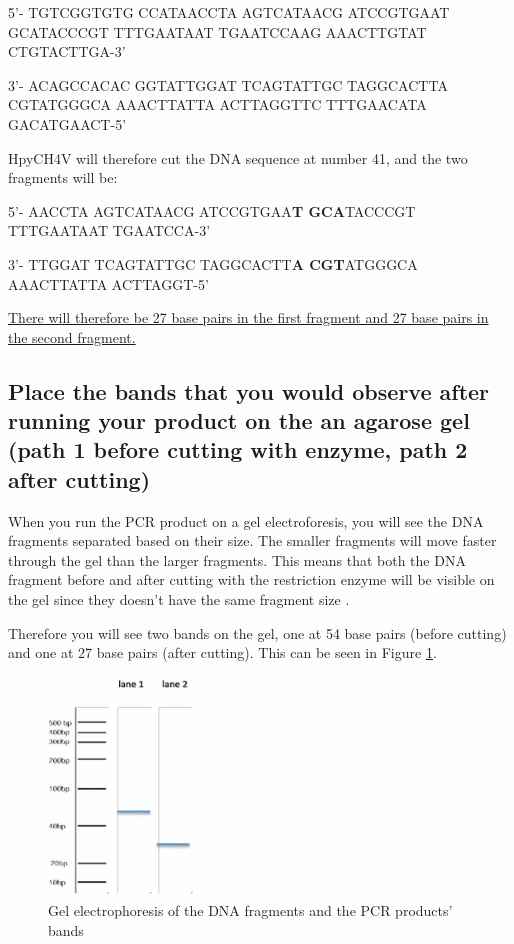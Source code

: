 5'- TGTCGGTGTG CCATAACCTA AGTCATAACG ATCCGTGAAT GCATACCCGT TTTGAATAAT TGAATCCAAG AAACTTGTAT CTGTACTTGA-3'

3'- ACAGCCACAC GGTATTGGAT TCAGTATTGC TAGGCACTTA CGTATGGGCA AAACTTATTA ACTTAGGTTC TTTGAACATA GACATGAACT-5'
\vspace{1em}

HpyCH4V will therefore cut the DNA sequence at number 41, and the two fragments will be:

5'- AACCTA AGTCATAACG ATCCGTGAA\textbf{T GCA}TACCCGT TTTGAATAAT TGAATCCA-3'

3'- TTGGAT TCAGTATTGC TAGGCACTT\textbf{A CGT}ATGGGCA AAACTTATTA ACTTAGGT-5'

\vspace{1em}   
\underline{There will therefore be 27 base pairs in the first fragment and 27 base pairs in the second fragment.}

\subsection{Place the bands that you would observe after running your product on the an agarose gel (path 1 before cutting with enzyme, path 2 after cutting)}

When you run the PCR product on a gel electroforesis, you will see the DNA fragments separated based on their size. The smaller fragments will move faster through the gel than the larger fragments. This means that both the DNA fragment before and after cutting with the restriction enzyme will be visible on the gel since they doesn't have the same fragment size   .

Therefore you will see two bands on the gel, one at 54 base pairs (before cutting) and one at 27 base pairs (after cutting).
This can be seen in Figure \ref{fig:Exercise2Gel}.
\clearpage
\begin{figure}[t]
    \centering
    \includegraphics[angle=270, width=0.35\textwidth]{Figures/Exc2Gel.JPG}
    \caption{Gel electrophoresis of the DNA fragments and the PCR products' bands}
    \label{fig:Exercise2Gel}
\end{figure}

